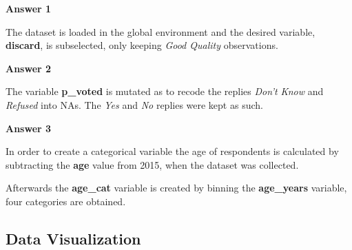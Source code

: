 \documentclass[12pt,letterpaper]{article}
\begin{document}
\vspace{1cm}
\noindent\textbf{Answer 1}\\
\vspace{0.5cm}

\noindent The dataset is loaded in the global environment and the desired variable, \textbf{discard}, is subselected, only keeping \emph{Good Quality} observations. 

\vspace{0.5cm}


\vspace{0.5cm}
\noindent\textbf{Answer 2}\\
\vspace{0.5cm}

\noindent The variable \textbf{p\_voted} is mutated as to recode the replies \emph{Don't Know} and \emph{Refused} into NAs. The \emph{Yes} and \emph{No} replies were kept as such.

\vspace{0.5cm}


\vspace{0.5cm}
\noindent\textbf{Answer 3}\\
\vspace{0.5cm}

\noindent In order to create a categorical variable the age of respondents is calculated by subtracting the \textbf{age} value from 2015, when the dataset was collected. 

\vspace{0.5cm}


\vspace{0.5cm}
\noindent Afterwards the \textbf{age\_cat} variable is created by binning the \textbf{age\_years} variable, four categories are obtained. 

\vspace{0.5cm}


\vspace{2cm}

\subsection*{Data Visualization}
\end{document}
